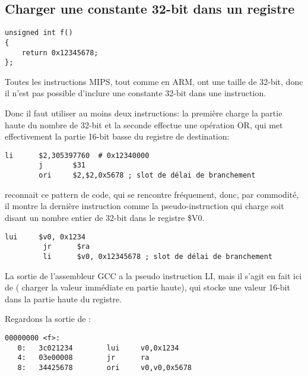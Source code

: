 ﻿\subsection{Charger une constante 32-bit dans un registre}
\label{MIPS_big_constants}

\begin{lstlisting}[style=customc]
unsigned int f()
{
	return 0x12345678;
};
\end{lstlisting}

Toutes les instructions MIPS, tout comme en ARM, ont une taille de 32-bit, donc il
n'est pas possible d'inclure une constante 32-bit dans une instruction.

Donc il faut utiliser au moins deux instructions:
la première charge la partie haute du nombre de 32-bit et la seconde effectue une
opération OR, qui met effectivement la partie 16-bit basse du registre de destination:

\begin{lstlisting}[caption=GCC 4.4.5 -O3 (\assemblyOutput),style=customasmMIPS]
        li      $2,305397760  # 0x12340000
        j       $31
        ori     $2,$2,0x5678 ; slot de délai de branchement
\end{lstlisting}

\IDA reconnait ce pattern de code, qui se rencontre fréquement, donc, par commodité,
il montre la dernière instruction  comme la pseudo-instruction  qui
charge soit disant un nombre entier de 32-bit dans le registre \$V0. %


\begin{lstlisting}[caption=GCC 4.4.5 -O3 (IDA),style=customasmMIPS]
         lui     $v0, 0x1234
         jr      $ra
         li      $v0, 0x12345678 ; slot de délai de branchement
\end{lstlisting}

La sortie de l'assembleur GCC a la pseudo instruction LI, mais il s'agit en fait
ici de  ( charger la valeur immédiate en partie
haute), qui stocke une valeur 16-bit dans la partie haute du registre.

Regardons la sortie de :

\begin{lstlisting}[caption=objdump,style=customasmMIPS]
00000000 <f>:
   0:   3c021234        lui     v0,0x1234
   4:   03e00008        jr      ra
   8:   34425678        ori     v0,v0,0x5678
\end{lstlisting}

